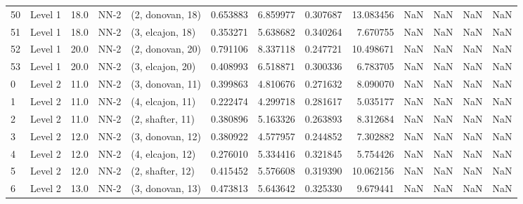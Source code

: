 \begin{tabular}{llrllrrrrrrrr}
50 &   Level 1 &   18.0 &        NN-2 &  (2, donovan, 18) &   0.653883 &   6.859977 &  0.307687 &  13.083456 &                  NaN &                    NaN &                 NaN &                   NaN \\
51 &   Level 1 &   18.0 &        NN-2 &  (3, elcajon, 18) &   0.353271 &   5.638682 &  0.340264 &   7.670755 &                  NaN &                    NaN &                 NaN &                   NaN \\
52 &   Level 1 &   20.0 &        NN-2 &  (2, donovan, 20) &   0.791106 &   8.337118 &  0.247721 &  10.498671 &                  NaN &                    NaN &                 NaN &                   NaN \\
53 &   Level 1 &   20.0 &        NN-2 &  (3, elcajon, 20) &   0.408993 &   6.518871 &  0.300336 &   6.783705 &                  NaN &                    NaN &                 NaN &                   NaN \\
0  &   Level 2 &   11.0 &        NN-2 &  (3, donovan, 11) &   0.399863 &   4.810676 &  0.271632 &   8.090070 &                  NaN &                    NaN &                 NaN &                   NaN \\
1  &   Level 2 &   11.0 &        NN-2 &  (4, elcajon, 11) &   0.222474 &   4.299718 &  0.281617 &   5.035177 &                  NaN &                    NaN &                 NaN &                   NaN \\
2  &   Level 2 &   11.0 &        NN-2 &  (2, shafter, 11) &   0.380896 &   5.163326 &  0.263893 &   8.312684 &                  NaN &                    NaN &                 NaN &                   NaN \\
3  &   Level 2 &   12.0 &        NN-2 &  (3, donovan, 12) &   0.380922 &   4.577957 &  0.244852 &   7.302882 &                  NaN &                    NaN &                 NaN &                   NaN \\
4  &   Level 2 &   12.0 &        NN-2 &  (4, elcajon, 12) &   0.276010 &   5.334416 &  0.321845 &   5.754426 &                  NaN &                    NaN &                 NaN &                   NaN \\
5  &   Level 2 &   12.0 &        NN-2 &  (2, shafter, 12) &   0.415452 &   5.576608 &  0.319390 &  10.062156 &                  NaN &                    NaN &                 NaN &                   NaN \\
6  &   Level 2 &   13.0 &        NN-2 &  (3, donovan, 13) &   0.473813 &   5.643642 &  0.325330 &   9.679441 &                  NaN &                    NaN &                 NaN &                   NaN \\

\end{tabular}
